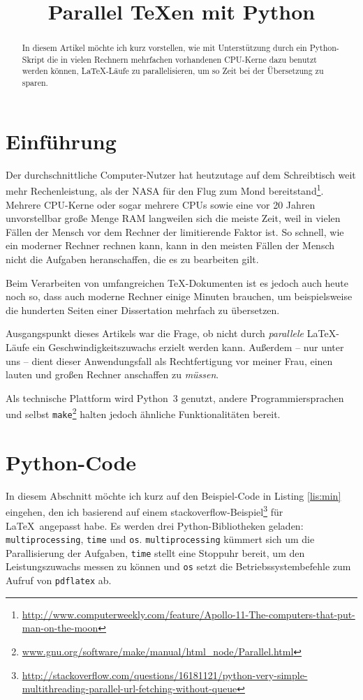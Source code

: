 \documentclass{dtk}
\title{Parallel \TeX en mit Python}
\begin{document}
\maketitle

\begin{abstract}
In diesem Artikel möchte ich kurz vorstellen, wie mit Unterstützung durch ein Python-Skript die in vielen Rechnern mehrfachen vorhandenen CPU-Kerne dazu benutzt werden können, \LaTeX-Läufe zu parallelisieren, um so Zeit bei der Übersetzung zu sparen.
\end{abstract}

\section{Einführung}

Der durchschnittliche Computer-Nutzer hat heutzutage auf dem Schreibtisch weit mehr Rechenleistung, als der NASA für den Flug zum Mond bereitstand\footnote{\url{http://www.computerweekly.com/feature/Apollo-11-The-computers-that-put-man-on-the-moon}}. Mehrere CPU-Kerne oder sogar mehrere CPUs sowie eine vor 20 Jahren unvorstellbar große Menge RAM langweilen sich die meiste Zeit, weil in vielen Fällen der Mensch vor dem Rechner der limitierende Faktor ist. So schnell, wie ein moderner Rechner rechnen kann, kann in den meisten Fällen der Mensch nicht die Aufgaben heranschaffen, die es zu bearbeiten gilt.

Beim Verarbeiten von umfangreichen \TeX-Dokumenten ist es jedoch auch heute noch so, dass auch moderne Rechner einige Minuten brauchen, um beispielsweise die hunderten Seiten einer Dissertation mehrfach zu übersetzen.

Ausgangspunkt dieses Artikels war die Frage, ob nicht durch \textit{parallele} \LaTeX-Läufe ein Geschwindigkeitszuwachs erzielt werden kann. Außerdem -- nur unter uns -- dient dieser Anwendungsfall als Rechtfertigung vor meiner Frau, einen lauten und großen Rechner anschaffen zu \textit{müssen}. 

Als technische Plattform wird Python~3 genutzt, andere Programmiersprachen und selbst \texttt{make}\footnote{\url{www.gnu.org/software/make/manual/html_node/Parallel.html}} halten jedoch ähnliche Funktionalitäten bereit.

\section{Python-Code}

In diesem Abschnitt möchte ich kurz auf den Beispiel-Code in Listing \ref{lis:min} eingehen, den ich basierend auf einem stackoverflow-Beispiel\footnote{\url{http://stackoverflow.com/questions/16181121/python-very-simple-multithreading-parallel-url-fetching-without-queue}} für \LaTeX\ angepasst habe. Es werden drei Python-Bibliotheken geladen: \texttt{multiprocessing}, \texttt{time} und \texttt{os}. \texttt{multiprocessing} kümmert sich um die Parallisierung der Aufgaben, \texttt{time} stellt eine Stoppuhr bereit, um den Leistungszuwachs messen zu können und \texttt{os} setzt die Betriebssystembefehle zum Aufruf von \texttt{pdflatex} ab.
\end{document}
